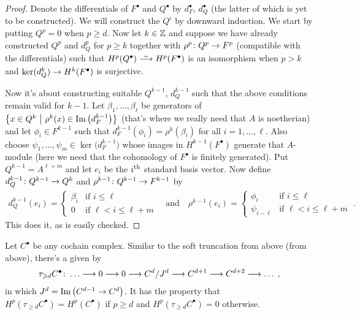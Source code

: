 \documentclass[a4paper,parskip=half,numbers=enddot, DIV=12]{scrreprt}
\renewcommand{\geq}{\geqslant}
\renewcommand{\leq}{\leqslant}
\begin{document}
\begin{proof}
	Denote the differentials of $F^\bullet$ and $Q^\bullet$ by $d_F^\bullet$, $d_Q^\bullet$ (the latter of which is yet to be constructed). We will construct the $Q^i$ by downward induction. We start by putting $Q^p=0$ when $p\geq d$. Now let $k\in\mathbb{Z}$ and suppose we have already constructed $Q^p$ and $d_Q^p$ for $p\geq k$ together with $\rho^p\colon Q^p\morphism F^p$ (compatible with the differentials) such that $H^p(Q^\bullet)\isomorphism H^p(F^\bullet)$ is an isomorphism when $p>k$ and $\ker(d_Q^k)\morphism H^k(F^\bullet)$ is surjective.
	
Now it's about constructing suitable $Q^{k-1}$, $d_Q^{k-1}$ such that the above conditions remain valid for $k-1$. Let $\beta_1,\ldots,\beta_\ell$ be generators of $\left\{x\in Q^k\ \middle|\  \rho^k(x)\in\operatorname{Im}\big(d_F^{k-1}\big)\right\}$
(that's where we really need that $A$ is noetherian) and let $\phi_i\in F^{k-1}$ such that $d_F^{k-1}(\phi_i)=\rho^k(\beta_i)$ for all $i=1,\ldots,\ell$. Also choose $\psi_1,\ldots,\psi_m\in\ker\big(d_F^{k-1}\big)$ whose images in $H^{k-1}(F^\bullet)$ generate that $A$-module (here we need that the cohomology of $F^\bullet$ is finitely generated). Put $Q^{k-1}=A^{\ell+m}$ and let $e_i$ be the $i^{\text{th}}$ standard basis vector. Now define $d_Q^{k-1}\colon Q^{k-1}\morphism Q^k$ and $\rho^{k-1}\colon Q^{k-1}\morphism F^{k-1}$ by
\begin{align*}
	d_Q^{k-1}(e_i)=
	\begin{cases}
		\beta_i &\text{if }i\leq \ell\\
		0 & \text{if }\ell <i\leq \ell+m
	\end{cases}\quad\text{and}\quad\rho^{k-1}(e_i)=
	\begin{cases}
		\phi_i & \text{if }i\leq \ell\\
		\psi_{i-\ell} & \text{if }\ell <i\leq \ell+m
	\end{cases}\;.
\end{align*}
This does it, as is easily checked.
\end{proof}
Let $C^\bullet$ be any cochain complex. Similar to the soft truncation from above (from above), there's a  given by
\begin{align*}
\tau_{\geq d}C^\bullet\colon\ldots\morphism 0\morphism 0\morphism C^d/J^d\morphism C^{d+1}\morphism C^{d+2}\morphism \ldots\;,
\end{align*}
in which $J^d=\Im\left(C^{d-1}\morphism C^d\right)$. It has the property that $H^p(\tau_{\geq d}C^\bullet)=H^p(C^\bullet)$ if $p\geq d$ and $H^p(\tau_{\geq d}C^\bullet)=0$ otherwise.
\end{document}
